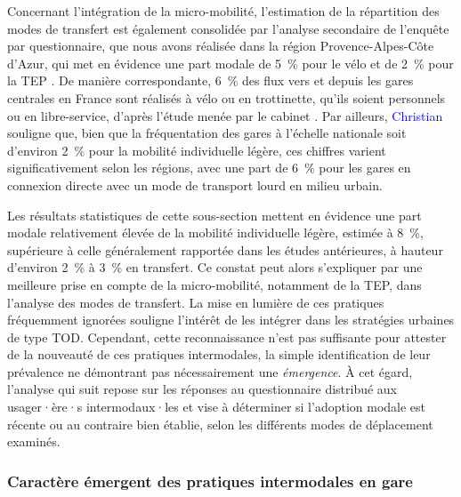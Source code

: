 \begin{refsegment}
Concernant l'intégration de la micro-mobilité, l'estimation de la répartition des modes de transfert est également consolidée par l'analyse secondaire de l'enquête par questionnaire, que nous avons réalisée dans la région Provence-Alpes-Côte d'Azur, qui met en évidence une part modale de 5~\% pour le vélo et de 2~\% pour la \acrshort{TEP} \textcolor{blue}{\autocite[180]{moinse_intermodal_2022}}. De manière correspondante, 6~\% des flux vers et depuis les gares centrales en France sont réalisés à vélo ou en trottinette, qu'ils soient personnels ou en libre-service, d'après l'étude menée par le cabinet \textcolor{blue}{\textcite[18]{enov_enquete_2021}}. Par ailleurs, \textcolor{blue}{Christian} \textcolor{blue}{\textcite[5]{gioria_etude_2016}} souligne que, bien que la fréquentation des gares à l'échelle nationale soit d'environ 2~\% pour la mobilité individuelle légère, ces chiffres varient significativement selon les régions, avec une part de 6~\% pour les gares en connexion directe avec un mode de transport lourd en milieu urbain.%

Les résultats statistiques de cette sous-section mettent en évidence une part modale relativement élevée de la mobilité individuelle légère, estimée à 8~\%, supérieure à celle généralement rapportée dans les études antérieures, à hauteur d'environ 2~\% à 3~\% en transfert. Ce constat peut alors s'expliquer par une meilleure prise en compte de la micro-mobilité, notamment de la \acrshort{TEP}, dans l'analyse des modes de transfert. La mise en lumière de ces pratiques fréquemment ignorées souligne l'intérêt de les intégrer dans les stratégies urbaines de type \acrshort{TOD}. Cependant, cette reconnaissance n'est pas suffisante pour attester de la nouveauté de ces pratiques intermodales, la simple identification de leur prévalence ne démontrant pas nécessairement une \textsl{émergence}. À cet égard, l'analyse qui suit repose sur les réponses au questionnaire distribué aux usager·ère·s intermodaux·les et vise à déterminer si l'adoption modale est récente ou au contraire bien établie, selon les différents modes de déplacement examinés.%

\subsubsection*{Caractère émergent des pratiques intermodales en gare
    \label{chap4:emergence-pratiques-intermodales}
    }


\end{refsegment}
